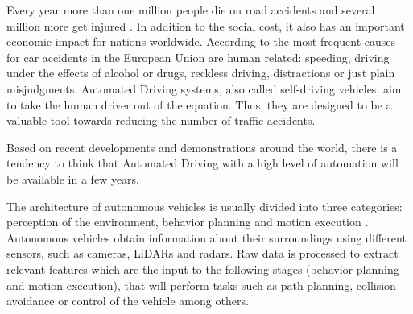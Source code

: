Every year more than one million people die on road accidents and several 
million more get injured \cite{world2015global}. In addition to the social cost, it also has an
important economic impact for nations worldwide. According to 
\cite{Thomas2013} the most frequent causes for car accidents in the
European Union are human related: speeding, driving under the effects of
alcohol or drugs, reckless driving, distractions or just plain misjudgments.
Automated Driving systems, also called self-driving vehicles, aim to take the 
human driver out of the equation. Thus, they are designed to be a valuable tool
towards reducing the number of traffic accidents.

Based on recent developments and demonstrations around the world, there is a 
tendency to think that Automated Driving with a high level of automation will 
be available in a few years. 
%

The architecture of autonomous vehicles is usually divided into three 
categories: perception of the environment, behavior planning and motion 
execution \cite{behere2015functional}. Autonomous 
vehicles obtain information about their surroundings using different
sensors, such as cameras, LiDARs and radars. Raw data is processed to extract
relevant features which are the input to the following stages (behavior
planning and motion execution), that will perform tasks such as path planning,
collision avoidance or control of the vehicle among others. 

